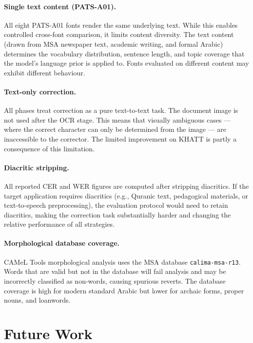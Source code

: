 \paragraph{Single text content (PATS-A01).}
All eight PATS-A01 fonts render the same underlying text. While this enables
controlled cross-font comparison, it limits content diversity. The text content
(drawn from MSA newspaper text, academic writing, and formal Arabic)
determines the vocabulary distribution, sentence length, and topic coverage
that the model's language prior is applied to. Fonts evaluated on different
content may exhibit different behaviour.

\paragraph{Text-only correction.}
All phases treat correction as a pure text-to-text task. The document image
is not used after the OCR stage. This means that visually ambiguous cases
--- where the correct character can only be determined from the image ---
are inaccessible to the corrector. The limited improvement on KHATT is partly
a consequence of this limitation.

\paragraph{Diacritic stripping.}
All reported CER and WER figures are computed after stripping diacritics.
If the target application requires diacritics (e.g., Quranic text, pedagogical
materials, or text-to-speech preprocessing), the evaluation protocol would
need to retain diacritics, making the correction task substantially harder
and changing the relative performance of all strategies.

\paragraph{Morphological database coverage.}
CAMeL Tools morphological analysis uses the MSA database
\texttt{calima-msa-r13}. Words that are valid but not in the database will
fail analysis and may be incorrectly classified as non-words, causing spurious
reverts. The database coverage is high for modern standard Arabic but lower
for archaic forms, proper nouns, and loanwords.

\section{Future Work}
\label{sec:disc_future}

